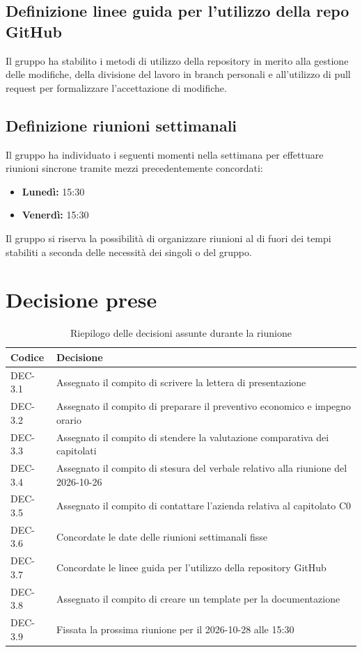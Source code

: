 \documentclass[11pt, a4paper]{article}
\begin{document}
\subsection{Definizione linee guida per l'utilizzo della repo GitHub}
Il gruppo ha stabilito i metodi di utilizzo della repository in merito alla gestione delle modifiche, della divisione del lavoro in branch personali e all'utilizzo di pull request per formalizzare l'accettazione di modifiche.

\subsection{Definizione riunioni settimanali}
Il gruppo ha individuato i seguenti momenti nella settimana per effettuare riunioni sincrone tramite mezzi precedentemente concordati:
\begin{itemize}
    \item \textbf{Lunedì:} 15:30
    \item \textbf{Venerdì:} 15:30
\end{itemize}
Il gruppo si riserva la possibilità di organizzare riunioni al di fuori dei tempi stabiliti a seconda delle necessità dei singoli o del gruppo.

\section{Decisione prese}
\begin{table}[htbp]
\centering
\caption{Riepilogo delle decisioni assunte durante la riunione}
\label{tab:decisioni}
\begin{tabularx}{\textwidth}{l X}
\toprule
\textbf{Codice} & \textbf{Decisione} \\
\midrule
DEC-3.1 & Assegnato il compito di scrivere la lettera di presentazione \\
DEC-3.2 & Assegnato il compito di preparare il preventivo economico e impegno orario \\
DEC-3.3 & Assegnato il compito di stendere la valutazione comparativa dei capitolati \\
DEC-3.4 & Assegnato il compito di stesura del verbale relativo alla riunione del 2026-10-26\\
DEC-3.5 & Assegnato il compito di contattare l'azienda relativa al capitolato C0 \\
DEC-3.6 & Concordate le date delle riunioni settimanali fisse \\
DEC-3.7 & Concordate le linee guida per l'utilizzo della repository GitHub \\
DEC-3.8 & Assegnato il compito di creare un template per la documentazione \\
DEC-3.9 & Fissata la prossima riunione per il 2026-10-28 alle 15:30 \\
\bottomrule
\end{tabularx}
\end{table}
\end{document}
